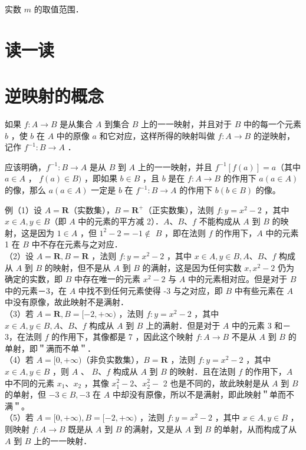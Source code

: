 \documentclass[10pt]{article}
\begin{document}
实数 \(m\) 的取值范围．

\section*{读一读}
\section*{逆映射的概念}
如果 \(f: A \rightarrow B\) 是从集合 \(A\) 到集合 \(B\) 上的一一映射，并且对于 \(B\) 中的每一个元素 \(b\) ，使 \(b\) 在 \(A\) 中的原像 \(a\) 和它对应，这样所得的映射叫做 \(f: A \rightarrow B\) 的逆映射，记作 \(f^{-1}: B \rightarrow A\) ．

应该明确，\(f^{-1}: B \rightarrow A\) 是从 \(B\) 到 \(A\) 上的一一映射，并且 \(f^{-1}[f(a)]=a\)（其中 \(a \in A\) ， \(f(a) \in B)\) ，即如果 \(b \in B\) ，且 \(b\) 是在 \(f: A \rightarrow B\) 的作用下 \(a(a \in A)\) 的像，那么 \(a(a \in A)\) 一定是 \(b\) 在 \(f^{-1}: B \rightarrow A\) 的作用下 \(b(b \in B)\) 的像。

例（1）设 \(A=\mathbf{R}\)（实数集），\(B=\mathbf{R}^{+}\)（正实数集），法则 \(f: y=x^{2}-2\) ，其中 \(x \in A, y \in B\)（即 \(A\) 中的元素的平方减 2）．\(A 、 B 、 f\) 不能构成从 \(A\) 到 \(B\) 的映射，这是因为 \(1 \in A\) ，但 \(1^{2}-2=-1 \notin\) \(B\) ，即在法则 \(f\) 的作用下，\(A\) 中的元素 1 在 \(B\) 中不存在元素与之对应．\\
（2）设 \(A=\mathbf{R}, B=\mathbf{R}\) ，法则 \(f: y=x^{2}-2\) ，其中 \(x \in A, y \in B, A 、 B 、 f\) 构成从 \(A\) 到 \(B\) 的映射，但不是从 \(A\) 到 \(B\) 的满射，这是因为任何实数 \(x, x^{2}-2\) 仍为确定的实数，即 \(B\) 中存在唯一的元素 \(x^{2}-2\) 与 \(A\) 中的元素相对应。但是对于 \(B\) 中的元素－3，在 \(A\) 中找不到任何元素使得 -3 与之对应，即 \(B\) 中有些元素在 \(A\) 中没有原像，故此映射不是满射．\\
（3）若 \(A=\mathbf{R}, B=[-2,+\infty)\) ，法则 \(f: y=x^{2}-2\) ，其中 \(x \in A, y \in B, A 、 B 、 f\) 构成从 \(A\) 到 \(B\) 上的满射．但是对于 \(A\) 中的元素 3 和－3，在法则 \(f\) 的作用下，其像都是 7 ，因此这个映射 \(f: A \rightarrow B\) 不是从 \(A\) 到 \(B\) 的单射，即＂满而不单＂．\\
（4）若 \(A=[0,+\infty)\)（非负实数集），\(B=\mathbf{R}\) ，法则 \(f: y=x^{2}-2\) ，其中 \(x \in A, y \in B\) ，则 \(A\) 、 \(B 、 f\) 构成从 \(A\) 到 \(B\) 的映射．且在法则 \(f\) 的作用下，\(A\) 中不同的元素 \(x_{1} 、 x_{2}\) ，其像 \(x_{1}^{2}-2 、 x_{2}^{2}-\) 2 也是不同的，故此映射是从 \(A\) 到 \(B\) 的单射，但 \(-3 \in B,-3\) 在 \(A\) 中却没有原像，所以不是满射，即此映射＂单而不满＂。\\
（5）若 \(A=[0,+\infty), B=[-2,+\infty)\) ，法则 \(f: y=x^{2}-2\) ，其中 \(x \in A, y \in B\) ，则映射 \(f: A \rightarrow B\) 既是从 \(A\) 到 \(B\) 的满射，又是从 \(A\) 到 \(B\) 的单射，从而构成了从 \(A\) 到 \(B\) 上的一一映射．
\end{document}
